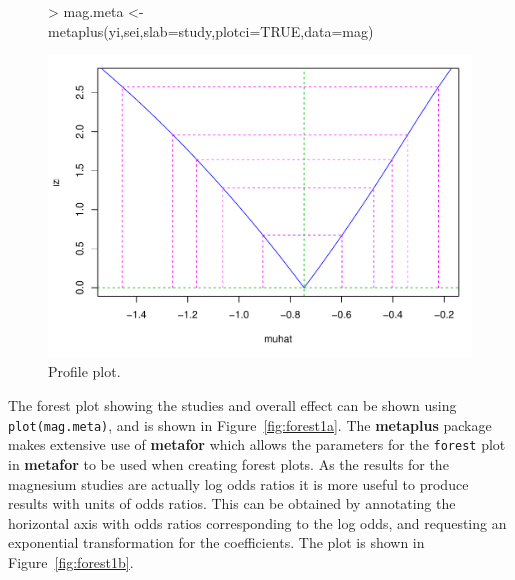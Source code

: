 \documentclass{article}
\begin{document}
\begin{figure}
  \centering
\begin{Schunk}
\begin{Sinput}
> mag.meta <- metaplus(yi,sei,slab=study,plotci=TRUE,data=mag)
\end{Sinput}
\end{Schunk}
\includegraphics{metaplus-examples-003}
  \caption{Profile plot.}
  \label{fig:profile1}
\end{figure}

The forest plot showing the studies and overall effect can be shown using \texttt{plot(mag.meta)}, and is shown in Figure~\ref{fig:forest1a}. The \textbf{metaplus} package makes extensive use of \textbf{metafor} which allows the parameters for the \texttt{forest} plot in \textbf{metafor} to be used when creating forest plots. As the results for the magnesium studies are actually log odds ratios it is more useful to produce results with units of odds ratios. This can be obtained by annotating the horizontal axis with odds ratios corresponding to the log odds, and requesting an exponential transformation for the coefficients. The plot is shown in Figure~\ref{fig:forest1b}.
\end{document}
